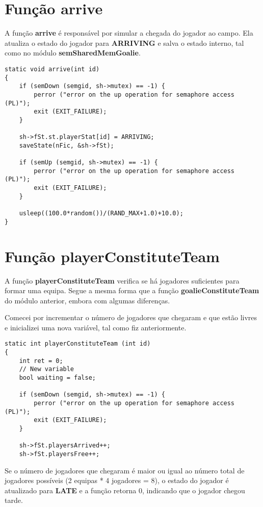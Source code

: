 \documentclass[code,math]{relatorio-deti}
\begin{document}
\section{Função \textbf{arrive}}

A função \textbf{arrive} é responsável por simular a chegada do jogador ao campo. Ela atualiza o estado do jogador para \textbf{ARRIVING} e salva o estado interno, tal como no módulo \textbf{semSharedMemGoalie}.

\begin{verbatim}
static void arrive(int id)
{
    if (semDown (semgid, sh->mutex) == -1) {                                                     
        perror ("error on the up operation for semaphore access (PL)");
        exit (EXIT_FAILURE);
    }

    sh->fSt.st.playerStat[id] = ARRIVING;
    saveState(nFic, &sh->fSt);

    if (semUp (semgid, sh->mutex) == -1) {                                                       
        perror ("error on the up operation for semaphore access (PL)");
        exit (EXIT_FAILURE);
    }

    usleep((100.0*random())/(RAND_MAX+1.0)+10.0);
}
\end{verbatim}

\section{Função \textbf{playerConstituteTeam}}

A função \textbf{playerConstituteTeam} verifica se há jogadores suficientes para formar uma equipa. Segue a mesma forma que a função \textbf{goalieConstituteTeam} do módulo anterior, embora com algumas diferenças.

Comecei por incrementar o número de jogadores que chegaram e que estão livres e inicializei uma nova variável, tal como fiz anteriormente.

\begin{verbatim}
static int playerConstituteTeam (int id)
{
    int ret = 0;
    // New variable
    bool waiting = false;

    if (semDown (semgid, sh->mutex) == -1) {
        perror ("error on the up operation for semaphore access (PL)");
        exit (EXIT_FAILURE);
    }

    sh->fSt.playersArrived++;
    sh->fSt.playersFree++;      
\end{verbatim}

Se o número de jogadores que chegaram é maior ou igual ao número total de jogadores possíveis (2 equipas * 4 jogadores = 8), o estado do jogador é atualizado para \textbf{LATE} e a função retorna 0, indicando que o jogador chegou tarde.
\end{document}
